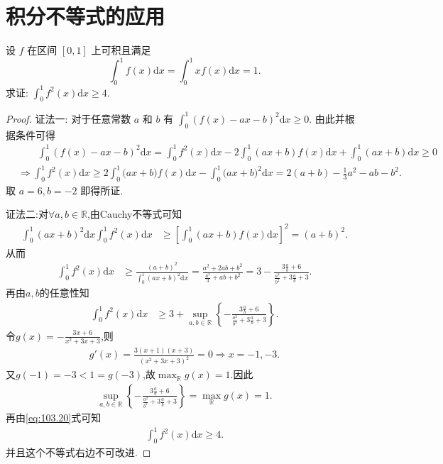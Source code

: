 \documentclass[../../main.tex]{subfiles}%
\begin{document}
\section{积分不等式的应用}

\begin{example}
设 $f$ 在区间 $[0,1]$ 上可积且满足
$$\int_0^1 f(x)\mathrm{d}x=\int_0^1 xf(x)\mathrm{d}x=1.$$
求证: $\int_0^1 f^2(x)\mathrm{d}x\geqslant 4$.
\end{example}
\begin{proof}

{\color{blue}证法一:}
对于任意常数 $a$ 和 $b$ 有 $\int_0^1 (f(x)-ax-b)^2\mathrm{d}x\geqslant 0$. 由此并根据条件可得
$$
\begin{aligned}
&\quad \quad \int_0^1{\left( f\left( x \right) -ax-b \right) ^2\mathrm{d}x}=\int_0^1{f^2\left( x \right) \mathrm{d}x}-2\int_0^1{\left( ax+b \right) f\left( x \right) \mathrm{d}x}+\int_0^1{\left( ax+b \right) \mathrm{d}x}\geqslant 0
\\
&\Longrightarrow \int_0^1{f^2\left( x \right) \mathrm{d}x}\geqslant 2\int_0^1{(ax}+b)f\left( x \right) \mathrm{d}x-\int_0^1{(ax}+b)^2\mathrm{d}x=2(a+b)-\frac{1}{3}a^2-ab-b^2.
\end{aligned}
$$
取 $a=6,b=-2$ 即得所证.

{\color{blue}证法二:}对$\forall a,b\in \mathbb{R}$,由Cauchy不等式可知
\begin{align*}
\int_0^1 (ax+b)^2\mathrm{d}x\int_0^1 f^2(x)\mathrm{d}x&\geqslant  \left[ \int_0^1 (ax+b)f(x)\mathrm{d}x \right]^2=(a+b)^2.
\end{align*}
从而
\begin{align*}
\int_0^1 f^2(x)\mathrm{d}x&\geqslant  \frac{(a+b)^2}{\int_0^1 (ax+b)^2\mathrm{d}x}=\frac{a^2+2ab+b^2}{\frac{a^2}{3}+ab+b^2}=3-\frac{3\frac{a}{b}+6}{\frac{a^2}{b^2}+3\frac{a}{b}+3}.
\end{align*}
再由$a,b$的任意性知
\begin{align}
\int_0^1 f^2(x)\mathrm{d}x&\geqslant  3+\sup_{a,b\in \mathbb{R}}\left\{ -\frac{3\frac{a}{b}+6}{\frac{a^2}{b^2}+3\frac{a}{b}+3} \right\}.\label{eq:103.20}
\end{align}
令$g(x)=-\frac{3x+6}{x^2+3x+3}$,则
\begin{align*}
g'(x)=\frac{3(x+1)(x+3)}{(x^2+3x+3)^2}=0\Rightarrow x=-1,-3.
\end{align*}
又$g(-1)=-3<1=g(-3)$,故$\max_{\mathbb{R}}g(x)=1$.因此
\begin{align*}
\sup_{a,b\in \mathbb{R}}\left\{ -\frac{3\frac{a}{b}+6}{\frac{a^2}{b^2}+3\frac{a}{b}+3} \right\}=\max_{\mathbb{R}}g(x)=1.
\end{align*}
再由\eqref{eq:103.20}式可知
\begin{align*}
\int_0^1 f^2(x)\mathrm{d}x\geqslant  4.
\end{align*}
并且这个不等式右边不可改进.
\end{proof}
\end{document}
